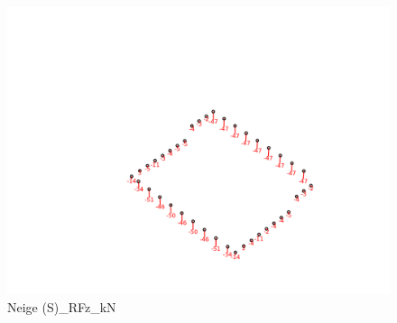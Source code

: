     \begin{figure}[H] %
        \centering %
        \includegraphics[width=\textwidth]{assets/img/graph3D_charges_cas_3_RFz_kN.png} %
        \caption{Neige (S)\_RFz\_kN} %
    \end{figure}

    